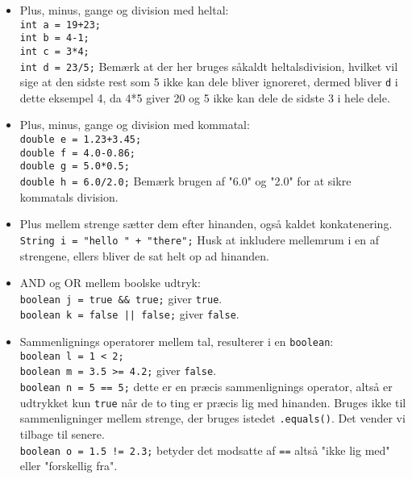 \begin{itemize}
	\item Plus, minus, gange og division med heltal: \\
	\texttt{int a = 19+23;} \\
	\texttt{int b = 4-1;} \\
	\texttt{int c = 3*4;} \\
	\texttt{int d = 23/5;} Bemærk at der her bruges såkaldt heltalsdivision, hvilket vil sige at den sidste rest som 5 ikke kan dele bliver ignoreret, dermed bliver \texttt{d} i dette eksempel 4, da 4*5 giver 20 og 5 ikke kan dele de sidste 3 i hele dele.
	
	\item Plus, minus, gange og division med kommatal:\\
	\texttt{double e = 1.23+3.45;}\\
	\texttt{double f = 4.0-0.86;}\\
	\texttt{double g = 5.0*0.5;}\\
	\texttt{double h = 6.0/2.0;} Bemærk brugen af "6.0" og "2.0" for at sikre kommatals division.
	
	\item Plus mellem strenge sætter dem efter hinanden, også kaldet konkatenering.\\
	\texttt{String i = "hello " + "there";} Husk at inkludere mellemrum i en af strengene, ellers bliver de sat helt op ad hinanden.
	
	\item AND og OR mellem boolske udtryk:\\
	\texttt{boolean j = true \&\& true;} giver \texttt{true}.\\
	\texttt{boolean k = false || false;} giver \texttt{false}.
	
	\item Sammenlignings operatorer mellem tal, resulterer i en \texttt{boolean}:\\
	\texttt{boolean l = 1 < 2;}\\
	\texttt{boolean m = 3.5 >= 4.2;} giver \texttt{false}.\\
	\texttt{boolean n = 5 == 5;} dette er en præcis sammenlignings operator, altså er udtrykket kun \texttt{true} når de to ting er præcis lig med hinanden. Bruges ikke til sammenligninger mellem strenge, der bruges istedet \texttt{.equals()}. Det vender vi tilbage til senere.\\
	\texttt{boolean o = 1.5 != 2.3;} betyder det modsatte af \texttt{==} altså "ikke lig med" eller "forskellig fra".
\end{itemize}

